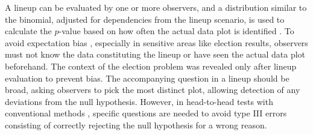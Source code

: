 \documentclass[10pt]{article}\usepackage[]{graphicx}\usepackage[]{xcolor}
\begin{document}

A lineup can be evaluated by one or more observers, and a distribution similar to the binomial, adjusted for dependencies from the lineup scenario, is used to calculate the $p$-value based on how often the actual data plot is identified \citep{vinference}. To avoid expectation bias \citep{meilgaard}, especially in sensitive areas like election results, observers must not know the data constituting the lineup or have seen the actual data plot beforehand. The context of the election problem was revealed only after lineup evaluation to prevent bias. The accompanying question in a lineup should be broad, asking observers to pick the most distinct plot, allowing detection of any deviations from the null hypothesis. However, in head-to-head tests with conventional methods \citep{majumder:2013, tengfei:2013}, specific questions are needed to avoid type III errors \citep{mosteller:48} consisting of correctly rejecting the null hypothesis for a wrong reason.


\end{document}
